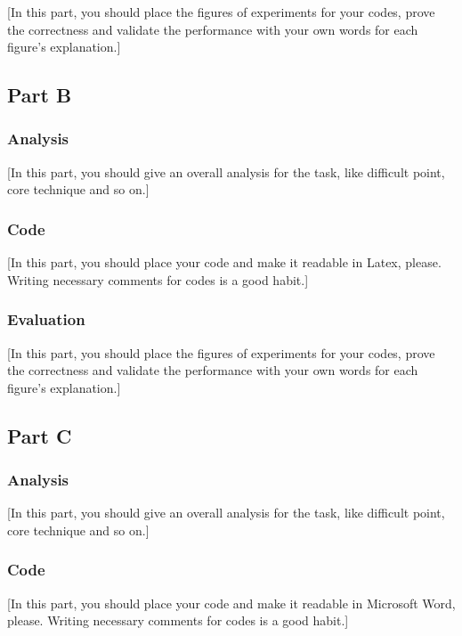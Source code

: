 \documentclass{article}
\begin{document}
[In this part, you should place the figures of experiments for your codes, prove the correctness and validate the performance with your own words for each figure’s explanation.]

\subsection{Part B}

\subsubsection{Analysis}

[In this part, you should give an overall analysis for the task, like difficult point, core technique and so on.]

\subsubsection{Code}

[In this part, you should place your code and make it readable in Latex, please. Writing necessary comments for codes is a good habit.]

\subsubsection{Evaluation}

[In this part, you should place the figures of experiments for your codes, prove the correctness and validate the performance with your own words for each figure’s explanation.]

\subsection{Part C}

\subsubsection{Analysis}

[In this part, you should give an overall analysis for the task, like difficult point, core technique and so on.]

\subsubsection{Code}

[In this part, you should place your code and make it readable in Microsoft Word, please. Writing necessary comments for codes is a good habit.]
\end{document}
